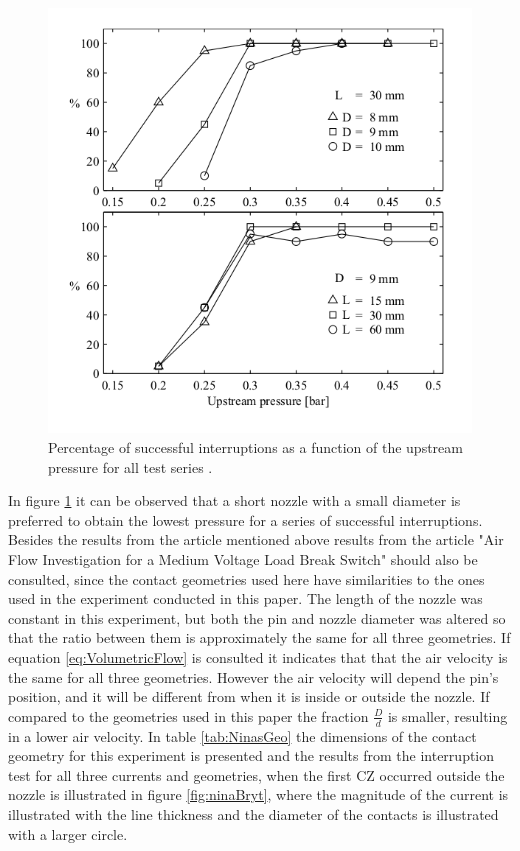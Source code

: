 \documentclass[10pt,a4paper]{article}
\begin{document}
\begin{figure}[H]
  \centering
  \includegraphics[scale=0.5]{Bilder/Discussion/percentSuccMVLBS.png}
  \caption{Percentage of successful interruptions as a function of the upstream pressure for all test series \cite{bib:CIAMVLBS}.}
  \label{fig:resultsCIMALBS}
\end{figure}

In figure \ref{fig:resultsCIMALBS} it can be observed that a short nozzle with a small diameter is preferred to obtain the lowest pressure for a series of successful interruptions. Besides the results from the article mentioned above results from the article "Air Flow Investigation for a Medium Voltage Load Break Switch" \cite{bib:AFIMVLBA} should also be consulted, since the contact geometries used here have similarities to the ones used in the experiment conducted in this paper. The length of the nozzle was constant in this experiment, but both the pin and nozzle diameter was altered so that the ratio between them is approximately the same for all three geometries. If equation \eqref{eq:VolumetricFlow} is consulted it indicates that that the air velocity is the same for all three geometries. However the air velocity will depend the pin's position, and it will be different from when it is inside or outside the nozzle. If compared to the geometries used in this paper the fraction $\frac{D}{d}$ is smaller, resulting in a lower air velocity. In table \ref{tab:NinasGeo} the dimensions of the contact geometry for this experiment is presented and the results from the interruption test for all three currents and geometries, when the first CZ occurred outside the nozzle is illustrated in figure \ref{fig:ninaBryt}, where the magnitude of the current is illustrated with the line thickness and the diameter of the contacts is illustrated with a larger circle.
\end{document}
